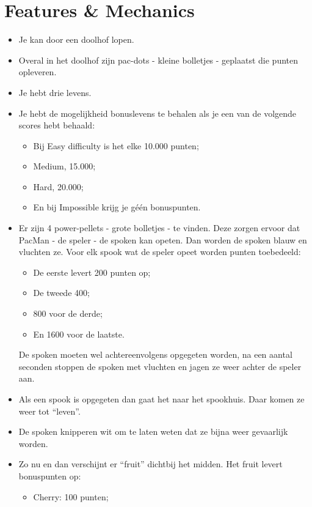 \documentclass{article}
\begin{document}
\section{Features \& Mechanics} %
\label{sec:features_&_mechanics}
\begin{itemize}[noitemsep]
    \item Je kan door een doolhof lopen.
    \item Overal in het doolhof zijn pac-dots - kleine bolletjes - geplaatst die punten opleveren.
    \item Je hebt drie levens.
    \item Je hebt de mogelijkheid bonuslevens te behalen als je een van de volgende scores hebt behaald:
    \begin{itemize}[noitemsep]
        \item Bij Easy difficulty is het elke 10.000 punten;
        \item Medium, 15.000;
        \item Hard, 20.000;
        \item En bij Impossible krijg je géén bonuspunten.
    \end{itemize}
    \item Er zijn 4 power-pellets - grote bolletjes - te vinden. Deze zorgen ervoor dat PacMan - de speler - de spoken kan opeten. Dan worden de spoken blauw en vluchten ze. Voor elk spook wat de speler opeet worden punten toebedeeld:
    \begin{itemize}[noitemsep]
        \item De eerste levert 200 punten op;
        \item De tweede 400;
        \item 800 voor de derde;
        \item En 1600 voor de laatste.
    \end{itemize}
    De spoken moeten wel achtereenvolgens opgegeten worden, na een aantal seconden stoppen de spoken met vluchten en jagen ze weer achter de speler aan.
    \item Als een spook is opgegeten dan gaat het naar het spookhuis. Daar komen ze weer tot ``leven''.
    \item De spoken knipperen wit om te laten weten dat ze bijna weer gevaarlijk worden.
    \item Zo nu en dan verschijnt er ``fruit'' dichtbij het midden. Het fruit levert bonuspunten op:
    \begin{itemize}[noitemsep]
        \item Cherry: 100 punten;

\end{itemize}
\end{itemize}
\end{document}
